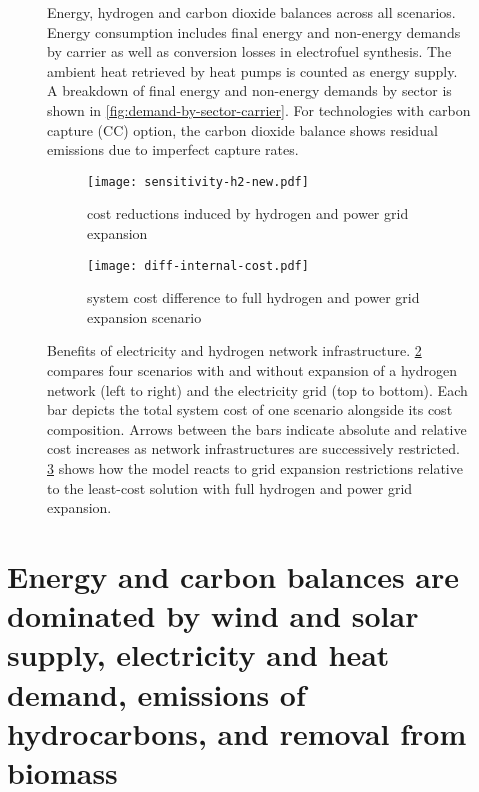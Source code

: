 
\begin{figure}
    \centering
     \caption{ Energy, hydrogen and carbon dioxide balances across all
    scenarios. Energy consumption includes final energy and non-energy demands
    by carrier as well as conversion losses in electrofuel synthesis. The
    ambient heat retrieved by heat pumps is counted as energy supply. A
    breakdown of final energy and non-energy demands by sector is shown in
    \cref{fig:demand-by-sector-carrier}. For technologies with carbon capture
    (CC) option, the carbon dioxide balance shows residual emissions due to
    imperfect capture rates. }
    \label{fig:balance}
\end{figure}

\begin{figure}
    \centering
    \begin{subfigure}[t]{\textwidth}
        \centering
        \caption{cost reductions induced by hydrogen and power grid expansion}
        \texttt{[image: sensitivity-h2-new.pdf]}
        \label{fig:sensitivity-h2-a}
    \end{subfigure}
    \begin{subfigure}[t]{\textwidth}
        \centering
        \caption{system cost difference to full hydrogen and power grid expansion scenario}
        \texttt{[image: diff-internal-cost.pdf]}
        \label{fig:sensitivity-h2-b}
    \end{subfigure}
    \caption{Benefits of electricity and hydrogen network infrastructure.
    \cref{fig:sensitivity-h2-a} compares four scenarios with and without
    expansion of a hydrogen network (left to right) and the electricity grid
    (top to bottom). Each bar depicts the total system cost of one scenario
    alongside its cost composition. Arrows between the bars indicate absolute
    and relative cost increases as network infrastructures are successively
    restricted. \cref{fig:sensitivity-h2-b} shows how the model reacts to grid
    expansion restrictions relative to the least-cost solution with full
    hydrogen and power grid expansion.}
    \label{fig:sensitivity-h2}
\end{figure}


\section*{Energy and carbon balances are dominated by wind and solar supply, electricity and heat demand, emissions of hydrocarbons, and removal from biomass}
\label{sec:balances}

